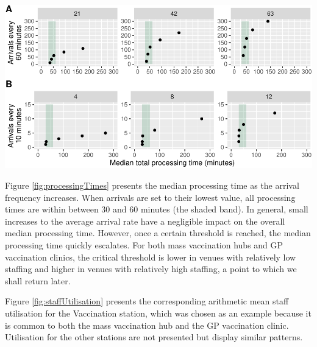 \documentclass{article}
\let\origfigure\figure
\let\endorigfigure\endfigure
\renewenvironment{figure}[1][2] {
    \expandafter\origfigure\expandafter[H]
} {
    \endorigfigure
}
\begin{document}
\begin{figure}

{\centering \includegraphics{Preprint_files/figure-latex/processingTimes-1} 

}

\caption{Median processing times by arrival frequency for a mass vaccination hub (A) and a GP vaccination clinic (B)}\label{fig:processingTimes}
\end{figure}

Figure \ref{fig:processingTimes} presents the median processing time as
the arrival frequency increases. When arrivals are set to their lowest
value, all processing times are within between 30 and 60 minutes (the
shaded band). In general, small increases to the average arrival rate
have a negligible impact on the overall median processing time. However,
once a certain threshold is reached, the median processing time quickly
escalates. For both mass vaccination hubs and GP vaccination clinics,
the critical threshold is lower in venues with relatively low staffing
and higher in venues with relatively high staffing, a point to which we
shall return later.

Figure \ref{fig:staffUtilisation} presents the corresponding arithmetic
mean staff utilisation for the Vaccination station, which was chosen as
an example because it is common to both the mass vaccination hub and the
GP vaccination clinic. Utilisation for the other stations are not
presented but display similar patterns.
\end{document}

